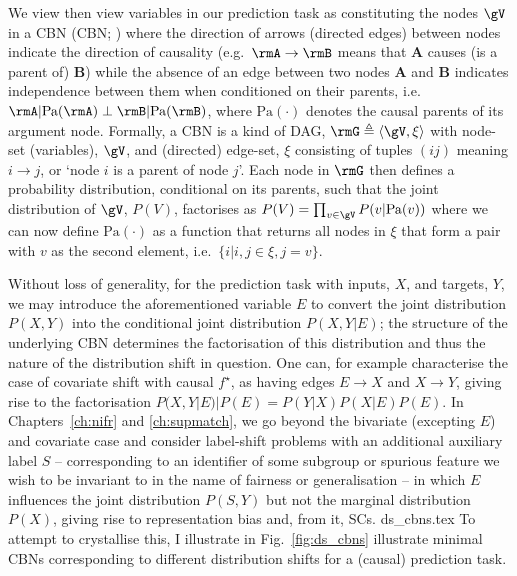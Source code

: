 We view then view variables in our prediction task as constituting the nodes \( \gV \) in a
\acl{CBN} (\acs{CBN}; \citealp{pearl1995bayesian}) where the direction of arrows (directed edges)
between nodes indicate the direction of causality (e.g.\ \(\rmA \to \rmB \) means that \textbf{A}
causes (is a parent of) \textbf{B}) while the absence of an edge between two nodes \textbf{A} and
\textbf{B} indicates independence between them when conditioned on their parents, i.e.\ \( \rmA |
\text{Pa}(\rmA) \perp \rmB | \text{Pa}(\rmB) \), where \( \text{Pa}(\cdot) \) denotes the causal
parents of its argument node.
%
Formally, a \ac{CBN} is a kind of \ac{DAG}, \(\rmG \triangleq \langle \gV, \xi
\rangle \) with node-set (variables), \(\gV\), and (directed) edge-set, \(\xi\) consisting of
tuples \((ij)\) meaning \(i \to j \), or `node \(i\) is a parent of node \(j\)'.
%
Each node in \( \rmG \) then defines a probability distribution, conditional on its parents, such
that the joint distribution of \(\gV\), \( P(V) \), factorises as \( P(V) = \prod_{v \in \gV} P(v |
\text{Pa}(v)) \) where we can now define \(\text{Pa}(\cdot)\) as a function that returns all nodes
in \(\xi\) that form a pair with \(v\) as the second element, i.e.\ \( \{ i | i,j \in \xi, j = v \}
\).
%

Without loss of generality, for the prediction task with inputs, \(X\), and targets, \(Y\), we may
introduce the aforementioned variable \(E\) to convert the joint distribution \(P(X, Y)\) into the
conditional joint distribution \( P(X, Y | E ) \); the structure of the underlying \ac{CBN}
determines the factorisation of this distribution and thus the nature of the distribution shift in
question.
%
One can, for example characterise the case of covariate shift with causal \(f^\star\), as having
edges  \(E \to X\) and \( X \to Y \), giving rise to the factorisation \( P(X, Y | E) | P(E) =
P(Y|X)P(X|E)P(E) \). 
%
In Chapters~\ref{ch:nifr} and \ref{ch:supmatch}, we go beyond the bivariate (excepting \( E \)) and
covariate case and consider label-shift problems with an additional auxiliary label \(S\) --
corresponding to an identifier of some subgroup or spurious feature we wish to be invariant to in
the name of fairness or generalisation --  in which \(E\) influences the joint distribution \( P(S,
Y) \) but not the marginal distribution \(P(X)\), giving rise to representation bias and, from it,
\acp{SC}.
%
%
{ds_cbns.tex}
%
To attempt to crystallise this, I illustrate in Fig.~\ref{fig:ds_cbns} illustrate minimal \acp{CBN}
corresponding to different distribution shifts for a (causal) prediction task.

